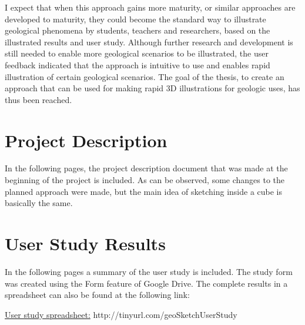 \documentclass[a4paper,12pt]{report}
\begin{document}
I expect that when this approach gains more maturity, or similar approaches are developed to maturity, they could become the standard way to illustrate geological phenomena by students, teachers and researchers, based on the illustrated results and user study. Although further research and development is still needed to enable more geological scenarios to be illustrated, the user feedback indicated that the approach is intuitive to use and enables rapid illustration of certain geological scenarios. The goal of the thesis, to create an approach that can be used for making rapid 3D illustrations for geologic uses, has thus been reached.


{}




\appendix
\chapter{Project Description}
\label{apx:description}
In the following pages, the project description document that was made at the beginning of the project is included. As can be observed, some changes to the planned approach were made, but the main idea of sketching inside a cube is basically the same.



\chapter{User Study Results}
\label{apx:study}
In the following pages a summary of the user study is included. The study form was created using the Form feature of Google Drive.
The complete results in a spreadsheet can also be found at the following link:

\href{https://docs.google.com/spreadsheet/ccc?key=0AkG0DNVsDqEudEc4X3I2MWNpUVlva0toUGNldHBTRlE}{User study spreadsheet:} http://tinyurl.com/geoSketchUserStudy


\end{document}
